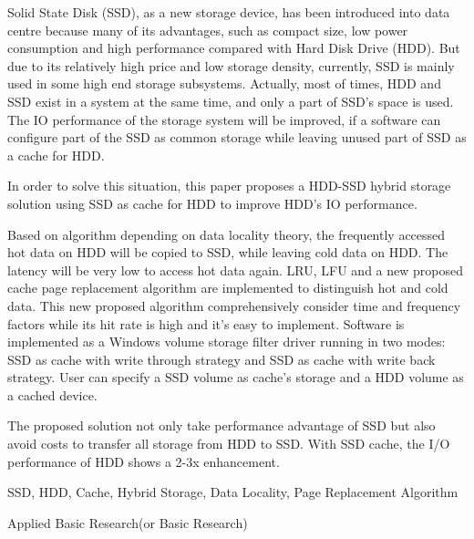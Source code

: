 \begin{eabstract}

Solid State Disk (SSD), as a new storage device, has been introduced into data centre because many of its advantages, such as compact size, low power consumption and high performance compared with Hard Disk Drive (HDD). But due to its relatively high price and low storage density, currently, SSD is mainly used in some high end storage subsystems. Actually, most of times, HDD and SSD exist in a system at the same time, and only a part of SSD's space is used. The IO performance of the storage system will be improved, if a software can configure part of the SSD as common storage while leaving unused part of SSD as a cache for HDD.

In order to solve this situation, this paper proposes a HDD-SSD hybrid storage solution using SSD as cache for HDD to improve HDD's IO performance.

Based on algorithm depending on data locality theory, the frequently accessed hot data on HDD will be copied to SSD, while leaving cold data on HDD. The latency will be very low to access hot data again. LRU, LFU and a new proposed cache page replacement algorithm are implemented to distinguish hot and cold data. This new proposed algorithm comprehensively consider time and frequency factors while its hit rate is high and it's easy to implement. Software is implemented as a Windows volume storage filter driver running in two modes: SSD as cache with write through strategy and SSD as cache with write back strategy. User can specify a SSD volume as cache's storage and a HDD volume as a cached device.

The proposed solution not only take performance advantage of SSD but also avoid costs to transfer all storage from HDD to SSD. With SSD cache, the I/O performance of HDD shows a 2-3x enhancement.

\end{eabstract}

\begin{ekeywords}
SSD, HDD, Cache, Hybrid Storage, Data Locality, Page Replacement Algorithm
\end{ekeywords}

\begin{ethesistype}
Applied Basic Research(or Basic Research)
\end{ethesistype}

